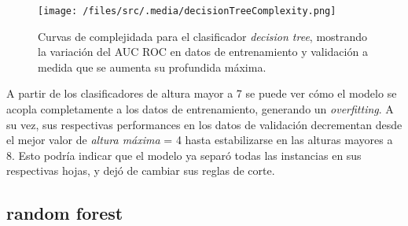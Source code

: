 \begin{figure}[!htbp]
    \centering
    \texttt{[image: /files/src/.media/decisionTreeComplexity.png]}
    \caption{Curvas de complejidada para el clasificador \textit{decision tree}, mostrando la variación del AUC ROC en datos de entrenamiento y validación a medida que se aumenta su profundida máxima.}
    \label{SVMComplexity}
\end{figure}

A partir de los clasificadores de altura mayor a 7 se puede ver cómo el modelo se  acopla completamente a los datos de entrenamiento, generando un \textit{overfitting}. A su vez, sus respectivas performances en los datos de validación decrementan desde el mejor valor de \textit{altura máxima} = 4 hasta estabilizarse en las alturas mayores a 8. Esto podría indicar que el modelo ya separó todas las instancias en sus respectivas hojas, y dejó de cambiar sus reglas de corte. 

\subsection{random forest}
